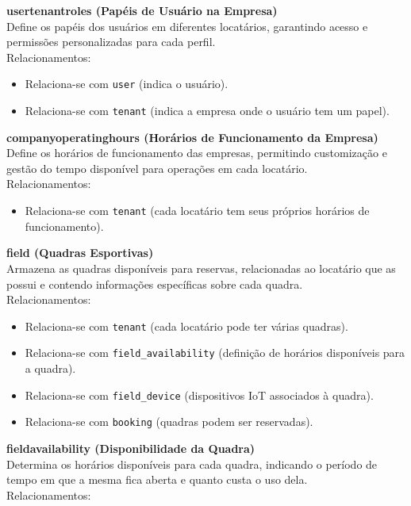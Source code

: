 \textbf{user\textunderscore tenant\textunderscore roles (Papéis de Usuário na Empresa)}\\
Define os papéis dos usuários em diferentes locatários, garantindo acesso e permissões personalizadas para cada perfil. \\
Relacionamentos: 

\begin{itemize} 
	\item Relaciona-se com \texttt{user} (indica o usuário). 
	\item Relaciona-se com \texttt{tenant} (indica a empresa onde o usuário tem um papel). 
\end{itemize}


\textbf{company\textunderscore operating\textunderscore hours (Horários de Funcionamento da Empresa)}\\
Define os horários de funcionamento das empresas, permitindo customização e gestão do tempo disponível para operações em cada locatário. \\
Relacionamentos: 

\begin{itemize} 
	\item Relaciona-se com \texttt{tenant} (cada locatário tem seus próprios horários de funcionamento). 
\end{itemize}


\textbf{field (Quadras Esportivas)}\\
Armazena as quadras disponíveis para reservas, relacionadas ao locatário que as possui e contendo informações específicas sobre cada quadra. \\
Relacionamentos: 

\begin{itemize} 
	\item Relaciona-se com \texttt{tenant} (cada locatário pode ter várias quadras). 
	\item Relaciona-se com \texttt{field\_availability} (definição de horários disponíveis para a quadra). 
	\item Relaciona-se com \texttt{field\_device} (dispositivos IoT associados à quadra). 
	\item Relaciona-se com \texttt{booking} (quadras podem ser reservadas). 
\end{itemize}


\textbf{field\textunderscore availability (Disponibilidade da Quadra)}\\
Determina os horários disponíveis para cada quadra, indicando o período de tempo em que a mesma fica aberta e quanto custa o uso dela. \\
Relacionamentos: 

